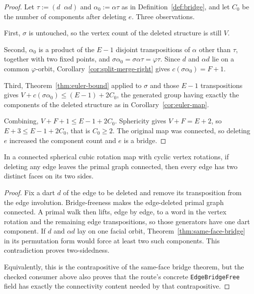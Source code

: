 \begin{proof}
Let $\tau := (d\;\;\alpha d)$ and $\alpha_0 := \alpha\tau$ as in
Definition~\ref{def:bridge}, and let $C_0$ be the number of components
after deleting $e$. Three observations.

First, $\sigma$ is untouched, so the vertex count of the deleted structure
is still $V$.

Second, $\alpha_0$ is a product of the $E-1$ disjoint transpositions of
$\alpha$ other than $\tau$, together with two fixed points, and
$\sigma\alpha_0 = \sigma\alpha\tau = \varphi\tau$. Since $d$ and $\alpha d$
lie on a common $\varphi$-orbit, Corollary~\ref{cor:split-merge-right}
gives $c(\sigma\alpha_0) = F + 1$.

Third, Theorem~\ref{thm:euler-bound} applied to $\sigma$ and those $E-1$
transpositions gives $V + c(\sigma\alpha_0) \le (E-1) + 2C_0$, the
generated group having exactly the components of the deleted structure as
in Corollary~\ref{cor:euler-map}.

Combining, $V + F + 1 \le E - 1 + 2C_0$. Sphericity gives $V + F = E + 2$,
so $E + 3 \le E - 1 + 2C_0$, that is $C_0 \ge 2$. The original map was
connected, so deleting $e$ increased the component count and $e$ is a
bridge.
\end{proof}

\begin{corollary}\label{cor:two-sided}
In a connected spherical cubic rotation map with cyclic vertex rotations,
if deleting any edge leaves the primal graph connected, then every edge has
two distinct faces on its two sides.
\end{corollary}

\begin{proof}
Fix a dart $d$ of the edge to be deleted and remove its transposition from
the edge involution.  Bridge-freeness makes the edge-deleted primal graph
connected.  A primal walk then lifts, edge by edge, to a word in the vertex
rotation and the remaining edge transpositions, so those generators have one
dart component.  If $d$ and $\alpha d$ lay on one facial orbit,
Theorem~\ref{thm:same-face-bridge} in its permutation form would force at
least two such components.  This contradiction proves two-sidedness.

Equivalently, this is the contrapositive of the same-face bridge theorem, but
the checked consumer above also proves that the route's concrete
\texttt{EdgeBridgeFree} field has exactly the connectivity content needed by
that contrapositive.
\end{proof}


